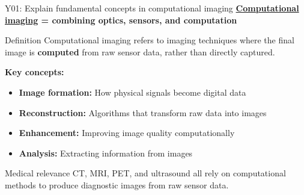 \documentclass[aspectratio=169, 10pt]{beamer}
\begin{document}
\begin{frame}{Y01: Explain fundamental concepts in computational imaging}
    \textbf{\href{https://en.wikipedia.org/wiki/Computational_imaging}{Computational imaging} = combining optics, sensors, and computation}
    
    \begin{block}{Definition}
        Computational imaging refers to imaging techniques where the final image is \textbf{computed} from raw sensor data, rather than directly captured.
    \end{block}
    
    \vspace{0.2cm}
    \textbf{Key concepts:}
    \begin{itemize}
        \item \textbf{Image formation:} How physical signals become digital data
        \item \textbf{Reconstruction:} Algorithms that transform raw data into images
        \item \textbf{Enhancement:} Improving image quality computationally
        \item \textbf{Analysis:} Extracting information from images
    \end{itemize}
    
    \vspace{0.1cm}
    {\small
    \begin{alertblock}{Medical relevance}
        CT, MRI, PET, and ultrasound all rely on computational methods to produce diagnostic images from raw sensor data.
    \end{alertblock}
    }
\end{frame}
\end{document}
